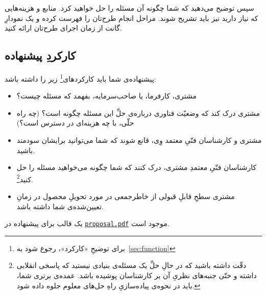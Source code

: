 \documentclass{article}
\begin{document}
سپس توضیح می‌دهید که شما چگونه آن مسئله را حل خواهید کرد. منابع و هزینه‌هایی که نیاز دارید نیز باید تشریح شوند. مراحل انجام طرح‌تان را فهرست کرده و یک نمودارِ گانت از زمان اجرای طرح‌تان ارائه کنید.
\subsection{کارکردِ پیشنهاده}
پیشنهاده‌ی شما باید کارکردهای\footnote{برای توضیحِ «کارکرد»، رجوع شود به~\ref{sec:function}} زیر را داشته باشد:
\begin{itemize}
	\item مشتری، کارفرما، یا صاحب‌سرمایه، بفهمد که مسئله چیست؟
	\item مشتری درک کند که وضعیّت فناوری درباره‌ی حلِّ این مسئله چگونه است؟ (چه راه حلّی، با چه هزینه‌ای در دسترس است؟)
	\item مشتری و کارشناسان فنّیِ معتمد وِی، قانع شوند که شما می‌توانید برایشان سودمند باشید.
	\item کارشناسان فنّیِ معتمدِ مشتری، درک کنند که شما چگونه می‌خواهید مسئله را حل کنید\footnote{دقّت داشته باشید که در حالِ حلِّ یک مسئله‌ی بنیادی نیستید که پاسخی انقلابی داشته و حتّی جنبه‌های نظریِ آن بر کارشناسان پوشیده باشد. عمده‌ی برتری شما، باید در نحوه‌ی پیاده‌سازیِ راهِ حل‌های معلوم جلوه داده شود.}.
	\item مشتری سطحِ قابلِ قبولی از خاطرجمعی در مورد تحویلِ محصول در زمانِ تعیین‌شده‌ی شما داشته باشد.
\end{itemize}
یک قالب برای پیشنهاده در \href{./proposal.pdf}{\texttt{proposal.pdf}} موجود است.
\end{document}
